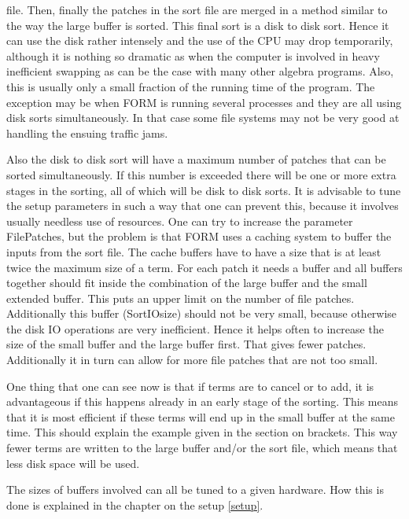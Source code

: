 file. Then, finally the patches in the sort file are merged in a method 
similar to the way the large buffer is sorted. This final sort is a 
disk to disk sort. Hence it can use the disk 
rather intensely and the use of the CPU may drop temporarily, although it 
is nothing so dramatic as when the computer is involved in heavy 
inefficient swapping as can be the case with many other algebra programs. 
Also, this is usually only a small fraction of the running time of the 
program. The exception may be when FORM is running several processes and 
they are all using disk sorts simultaneously. In that case some file 
systems may not be very good at handling the ensuing
traffic jams.

Also the disk to disk sort will have a maximum number of patches that can 
be sorted simultaneously. If this number is exceeded there will be one or 
more extra stages in the sorting, all of which 
will be disk to disk sorts. It is advisable to tune the setup parameters in 
such a way that one can prevent this, because it involves usually needless 
use of resources. One can try to increase the parameter 
FilePatches, but the problem is that FORM uses a 
caching system to buffer the inputs from the sort file. The 
cache buffers have to have a size that is at least twice the maximum size 
of a term. For each patch it needs a buffer and all buffers together should 
fit inside the combination of the large buffer and the small extended 
buffer. This puts an upper limit on the number of file patches. 
Additionally this buffer (SortIOsize) should not be very 
small, because otherwise the disk IO operations are very inefficient. Hence 
it helps often to increase the size of the small buffer and the large 
buffer first. That gives fewer patches. Additionally it in turn can allow 
for more file patches that are not too small.

One thing that one can see now is that if terms are to cancel or to add, it 
is advantageous if this happens already in an early stage of the sorting. 
This means that it is most efficient if these terms will end up in the 
small buffer at the same time. This should explain the example given in the 
section on brackets. This way fewer terms are written to 
the large buffer and/or the sort file, which means that less disk space 
will be used.

The sizes of buffers involved can all be tuned to a given hardware. How 
this is done is explained in the chapter on the setup \ref{setup}.

